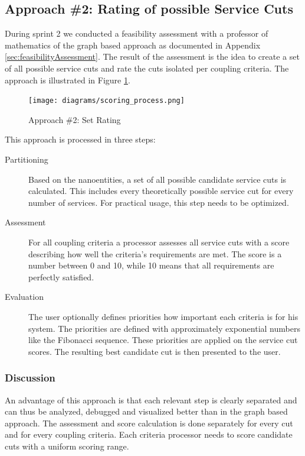 \subsection{Approach \#2: Rating of possible Service Cuts}

During sprint 2 we conducted a feasibility assessment with a professor of mathematics of the graph based approach as documented in Appendix \ref{sec:feasibilityAssessment}. The result of the assessment is the idea to create a set of all possible service cuts and rate the cuts isolated per coupling criteria. The approach is illustrated in Figure \ref{fig:setProcess}.

\begin{figure}[H]
	\begin{center}
		\texttt{[image: diagrams/scoring\_process.png]}
	\end{center}
	\caption{Approach \#2: Set Rating}
	\label{fig:setProcess}
\end{figure}

This approach is processed in three steps:

\begin{description}
	\item[Partitioning] Based on the nanoentities, a set of all possible candidate service cuts is calculated. This includes every theoretically possible service cut for every number of services. For practical usage, this step needs to be optimized. 
	\item[Assessment] For all coupling criteria a processor assesses all service cuts with a score describing how well the criteria's requirements are met. The score is a number between 0 and 10, while 10 means that all requirements are perfectly satisfied. 
	\item[Evaluation] The user optionally defines priorities how important each criteria is for his system. The priorities are defined with approximately exponential numbers like the Fibonacci sequence. These priorities are applied on the service cut scores. The resulting best candidate cut is then presented to the user.
\end{description}

\subsubsection{Discussion}

An advantage of this approach is that each relevant step is clearly separated and can thus be analyzed, debugged and visualized better than in the graph based approach. The assessment and score calculation is done separately for every cut and for every coupling criteria. Each criteria processor needs to score candidate cuts with a uniform scoring range. 

